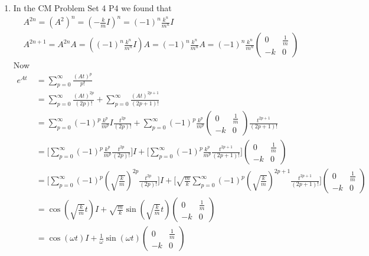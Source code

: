 \documentclass{article}
\begin{document}
\begin{enumerate}
	\item In the CM Problem Set 4 P4 we found that \begin{align*}
		&A^{2n}=(A^2)^n=\left( -\frac{k}{m}I\right)^n=(-1)^n\frac{k^n}{m^n}I\\
		&A^{2n+1}=A^{2n}A=\left((-1)^n\frac{k^n}{m^n}I \right) A=(-1)^n\frac{k^n}{m^n}A=(-1)^n\frac{k^n}{m^n}\begin{pmatrix}
			0&\frac1m\\
			-k&0
		\end{pmatrix}
	\end{align*}Now\begin{align*}
	e^{At}\ &=\sum\limits_{p=0}^{\infty}\frac{(At)^p}{p!}\\
	&=\sum\limits_{p=0}^{\infty}\frac{(At)^{2p}}{(2p)!}+\sum\limits_{p=0}^{\infty}\frac{(At)^{2p+1}}{(2p+1)!}\\
	&=\sum\limits_{p=0}^{\infty}(-1)^p\frac{k^p}{m^p}I\frac{t^{2p}}{(2p)!}+\sum\limits_{p=0}^{\infty}(-1)^p\frac{k^p}{m^p}\begin{pmatrix}
		0&\frac1m\\
		-k&0
	\end{pmatrix}\frac{t^{2p+1}}{(2p+1)!}\\
	&=\Bigg[\sum\limits_{p=0}^{\infty}(-1)^p\frac{k^p}{m^p}\frac{t^{2p}}{(2p)!}\Bigg]I+\Bigg[\sum\limits_{p=0}^{\infty}(-1)^p\frac{k^p}{m^p}\frac{t^{2p+1}}{(2p+1)!}\Bigg]\begin{pmatrix}
		0&\frac1m\\
		-k&0
	\end{pmatrix}\\
&=\Bigg[\sum\limits_{p=0}^{\infty}(-1)^p\left( \sqrt{\frac{k}{m}}\right) ^{2p}\frac{t^{2p}}{(2p)!}\Bigg]I+\Bigg[ \sqrt{\frac{m}{k}}\sum\limits_{p=0}^{\infty}(-1)^p\left( \sqrt{\frac{k}{m}}\right)^{2p+1}\frac{t^{2p+1}}{(2p+1)!}\Bigg]\begin{pmatrix}
	0&\frac1m\\
	-k&0
\end{pmatrix}\\
&=\cos\left( \sqrt{\frac{k}{m}}t \right) I+ \sqrt{\frac{m}{k}}\sin\left( \sqrt{\frac{k}{m}}t \right) \begin{pmatrix}
	0&\frac1m\\
	-k&0
\end{pmatrix}\\
&=\cos\left( \omega t \right) I+\frac1{\omega} \sin\left( \omega t \right)\begin{pmatrix}
	0&\frac1m\\
	-k&0
\end{pmatrix}\\

\end{align*}
\end{enumerate}
\end{document}
